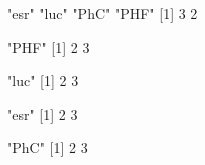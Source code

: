 \documentclass{article}\usepackage[]{graphicx}\usepackage[]{color}
\begin{document}
\begin{Schunk}
\begin{Soutput}
[1] "esr" "luc" "PhC" "PHF"
[1] 3 2
\end{Soutput}
\end{Schunk}
\begin{Schunk}
\begin{Soutput}
[1] "PHF"
[1] 2 3
\end{Soutput}
\begin{Soutput}
[1] "luc"
[1] 2 3
\end{Soutput}
\begin{Soutput}
[1] "esr"
[1] 2 3
\end{Soutput}
\begin{Soutput}
[1] "PhC"
[1] 2 3
\end{Soutput}
\end{Schunk}
\end{document}
